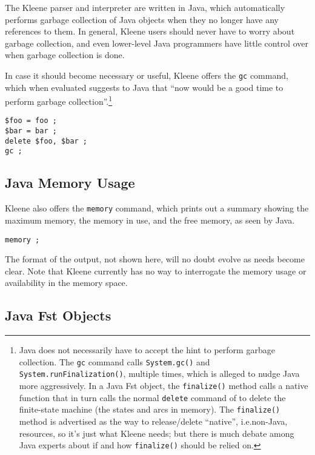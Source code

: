 The Kleene parser and interpreter are written in Java, which
automatically performs garbage collection of Java objects when they no
longer have any references to them.  In general, Kleene users should
never have to worry about garbage collection, and even lower-level Java
programmers have little control over when garbage collection is done.  

In case it should become necessary or useful, Kleene offers the
\texttt{gc} command, which when evaluated suggests to Java that ``now
would be a good time to perform garbage collection''.\footnote{Java does
not necessarily have to accept the hint to perform garbage collection.
The \texttt{gc} command calls \texttt{System.gc()} and
\texttt{System.runFinalization()}, multiple times, which is alleged to
nudge Java more aggressively.  In a Java Fst object, the
\texttt{finalize()} method calls a native \CPP{} function that in turn
calls the normal \texttt{delete} command of \CPP{} to delete the \CPP{}
finite-state machine (the states and arcs in \CPP{} memory). The
\texttt{finalize()} method is advertised as the way to release/delete
``native'', i.e.\@ non-Java, resources, so it's just what Kleene needs;
but there is much debate among Java experts about if and how
\texttt{finalize()} should be relied on.}

\begin{samepage}
\begin{Verbatim}
$foo = foo ;
$bar = bar ;
delete $foo, $bar ;
gc ;
\end{Verbatim}
\end{samepage}

\subsection{Java Memory Usage}

Kleene also offers the \texttt{memory}
command, which prints out a summary showing the maximum memory, the
memory in use, and the free memory, as seen by Java.

\begin{Verbatim}
memory ;
\end{Verbatim}

\noindent
The format of the output, not shown here, will no doubt evolve as needs
become clear.  Note that Kleene currently has no way to interrogate the
memory usage or availability in the \CPP{} memory space.

\subsection{Java Fst Objects}

